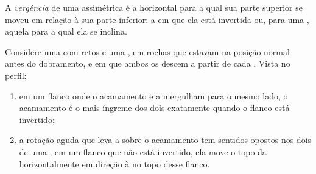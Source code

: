 \begin{definition}[Vergência]\label{def:b1:faults-folds-fabrics:vergence}
A \emph{vergência} de uma  assimétrica é a  horizontal para a qual sua parte superior se moveu em relação à sua parte inferior: a  em que ela está invertida ou, para uma , aquela para a qual ela se inclina.
\end{definition}

\begin{proposition}\label{prop:b1:faults-folds-fabrics:cleavage-bedding}
Considere uma  com  retos e uma , em rochas que estavam na posição normal antes do dobramento, e em que ambos os  descem a partir de cada  . Vista no perfil:
\begin{enumerate}[label=(\alph*)]
  \item em um flanco onde o acamamento e a  mergulham para o mesmo lado, o acamamento é o mais íngreme dos dois exatamente quando o flanco está invertido;
  \item a rotação aguda que leva a  sobre o acamamento tem sentidos opostos nos dois  de uma ; em um flanco que não está invertido, ela move o topo da  horizontalmente em direção à   no topo desse flanco.
\end{enumerate}
\end{proposition}

